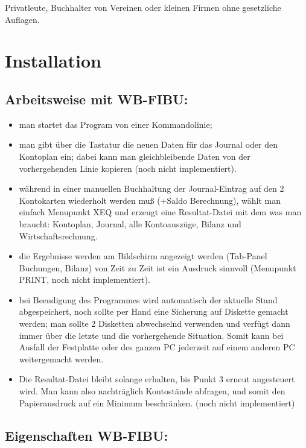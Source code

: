 \documentclass[12pt]{report}
\begin{document}
Privatleute, Buchhalter von Vereinen oder kleinen Firmen ohne gesetzliche
Auflagen.
\chapter{Installation}
\section{Arbeitsweise mit WB-FIBU:}

\begin{itemize}

\item man startet das Program von einer Kommandolinie;

\item man gibt über die Tastatur die neuen Daten für das Journal oder den
Kontoplan ein; dabei kann man gleichbleibende Daten von der vorhergehenden
Linie kopieren (noch nicht implementiert).

\item während in einer manuellen Buchhaltung der Journal-Eintrag auf den 2
Kontokarten wiederholt werden muß (+Saldo Berechnung), wählt man einfach
Menupunkt XEQ und erzeugt eine Resultat-Datei mit dem was man braucht:
Kontoplan, Journal, alle Kontoauszüge, Bilanz und Wirtschaftsrechnung.

\item die Ergebnisse werden am Bildschirm angezeigt werden (Tab-Panel
Buchungen, Bilanz) von Zeit zu Zeit ist ein Ausdruck sinnvoll (Menupunkt PRINT,
noch nicht implementiert).

\item bei Beendigung des Programmes wird automatisch der aktuelle Stand
abgespeichert, noch sollte per Hand eine Sicherung auf Diskette gemacht werden;
man sollte 2 Disketten abwechselnd verwenden und verfügt dann immer über die
letzte und die vorhergehende Situation.  Somit kann bei Ausfall der Festplatte
oder des ganzen PC jederzeit auf einem anderen PC weitergemacht werden.

\item Die Resultat-Datei bleibt solange erhalten, bis Punkt 3 erneut
angesteuert wird. Man kann also nachträglich Kontostände abfragen, und somit
den Papierausdruck auf ein Minimum beschränken. (noch nicht implementiert)

\end{itemize}

\section{Eigenschaften WB-FIBU:}
\end{document}
